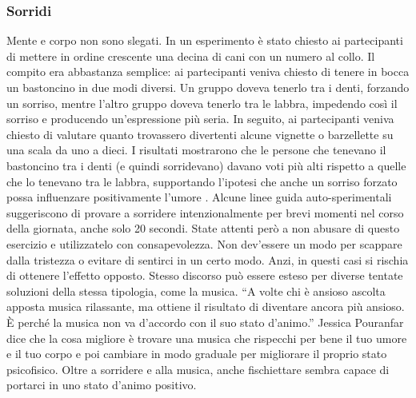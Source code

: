 \documentclass[12pt]{book} %
\begin{document}
\subsubsection{Sorridi}
Mente e corpo non sono slegati. In un esperimento è stato chiesto ai partecipanti di mettere in ordine crescente una
decina di cani con un numero al collo. Il compito era abbastanza semplice: ai partecipanti veniva chiesto di tenere in bocca un bastoncino in due modi diversi. Un gruppo doveva tenerlo tra i denti, forzando un sorriso, mentre l'altro gruppo doveva tenerlo tra le labbra, impedendo così il sorriso e producendo un'espressione più seria. In seguito, ai partecipanti veniva chiesto di valutare quanto trovassero divertenti alcune vignette o barzellette su una scala da uno a dieci. I risultati mostrarono che le persone che tenevano il bastoncino tra i denti (e quindi sorridevano) davano voti più alti rispetto a quelle che lo tenevano tra le labbra, supportando l'ipotesi che anche un sorriso forzato possa influenzare positivamente l’umore   .
Alcune linee guida auto-sperimentali suggeriscono di provare a sorridere intenzionalmente per brevi momenti nel corso della giornata, anche solo 20 secondi. State attenti però a non abusare di questo esercizio e utilizzatelo
con consapevolezza. Non dev'essere un modo per scappare dalla tristezza o evitare di sentirci in
un certo modo. Anzi, in questi casi si rischia di ottenere l'effetto opposto. Stesso discorso può essere esteso per diverse tentate soluzioni
della stessa tipologia, come la musica. “A volte chi è ansioso ascolta apposta musica rilassante, ma ottiene il
risultato di diventare ancora più ansioso. È perché la musica non va d'accordo con il suo stato
d'animo.” Jessica Pouranfar dice che la cosa migliore è trovare una musica che rispecchi per bene
il tuo umore e il tuo corpo e poi cambiare in modo graduale per migliorare il proprio stato
psicofisico. 
Oltre a sorridere e alla musica, anche fischiettare sembra capace di portarci in uno stato d'animo positivo.
\end{document}
